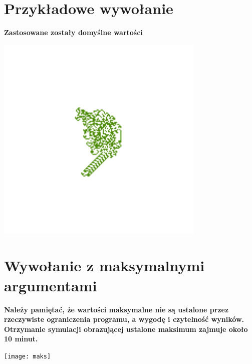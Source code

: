 \documentclass[a4paper,12pt]{article}
\begin{document}
\section{Przykładowe wywołanie}
\textbf{Zastosowane zostały domyślne wartości}
\begin{center}
\includegraphics[height=10cm]{out}
\end{center}
\newpage
\section{Wywołanie z maksymalnymi argumentami}
\textbf{Należy pamiętać, że wartości maksymalne nie są ustalone przez rzeczywiste ograniczenia programu, a wygodę  i czytelność wyników. Otrzymanie symulacji obrazującej ustalone maksimum zajmuje około 10 minut.}
\begin{center}
\texttt{[image: maks]}
\end{center}
\end{document}
